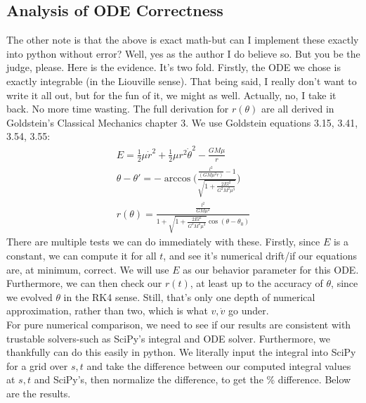 \documentclass{article}
\begin{document}
\subsection{Analysis of ODE Correctness}
The other note is that the above is exact math-but can I implement these exactly into python without error? Well, yes as the author I do believe so. But you be the judge, please. Here is the evidence. It's two fold. Firstly, the ODE we chose is exactly integrable (in the Liouville sense). That being said, I really don't want to write it all out, but for the fun of it, we might as well. Actually, no, I take it back. No more time wasting. The full derivation for $r(\theta)$ are all derived in Goldstein's Classical Mechanics chapter 3. We use Goldstein equations 3.15, 3.41, 3.54, 3.55:
\begin{gather}
    E=\frac{1}{2} \mu \dot{r}^2+\frac{1}{2}\mu r^2\dot{\theta}^2-\frac{GM\mu}{r}
    \\ \theta-\theta'=-\arccos \big(\frac{\frac{l^2}{(G M\mu^2 r)} - 1} {\sqrt{1+\frac{2 El^2}{G^2M^2 \mu^3}}}\big)
    \\ r(\theta) = \frac{\frac{l^2}{GM \mu^2}}{1+\sqrt{1+\frac{2El^2}{G^2M^2 \mu^3}}\cos(\theta-\theta_0)}
\end{gather}
There are multiple tests we can do immediately with these. Firstly, since $E$ is a constant, we can compute it for all $t$, and see it's numerical drift/if our equations are, at minimum, correct. We will use $E$ as our behavior parameter for this ODE. Furthermore, we can then check our $r(t)$, at least up to the accuracy of $\theta$, since we evolved $\theta$ in the RK4 sense. Still, that's only one depth of numerical approximation, rather than two, which is what $v,\dot{v}$ go under. \\
For pure numerical comparison, we need to see if our results are consistent with trustable solvers-such as SciPy's integral and ODE solver. Furthermore, we thankfully can do this easily in python. We literally input the integral into SciPy for a grid over $s,t$ and take the difference between our computed integral values at $s,t$ and SciPy's, then normalize the difference, to get the \% difference. Below are the results. \\
\end{document}
